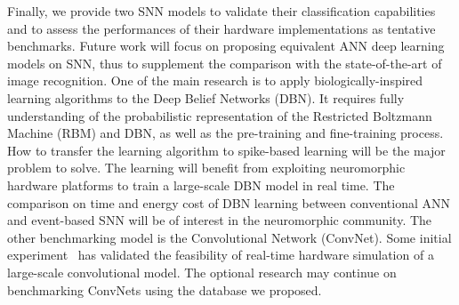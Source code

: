 \documentclass[journal]{journal}
\begin{document}
	Finally, we provide two SNN models to validate their classification capabilities and to assess the performances of their hardware implementations as tentative benchmarks.
	Future work will focus on proposing equivalent ANN deep learning models on SNN, thus to supplement the comparison with the state-of-the-art of image recognition.
	One of the main research is to apply biologically-inspired learning algorithms to the Deep Belief Networks (DBN).
	It requires fully understanding of the probabilistic representation of the Restricted Boltzmann Machine (RBM) and DBN, as well as the pre-training and fine-training process.
	How to transfer the learning algorithm to spike-based learning will be the major problem to solve.
	The learning will benefit from exploiting neuromorphic hardware platforms to train a large-scale DBN model in real time.
	The comparison on time and energy cost of DBN learning between conventional ANN and event-based SNN will be of interest in the neuromorphic community.
	The other benchmarking model is the Convolutional Network (ConvNet).
	Some initial experiment~\cite{camunas2012event} has validated the feasibility of real-time hardware simulation of a large-scale convolutional model.
	The optional research may continue on benchmarking ConvNets using the database we proposed.     
	  
\end{document}
